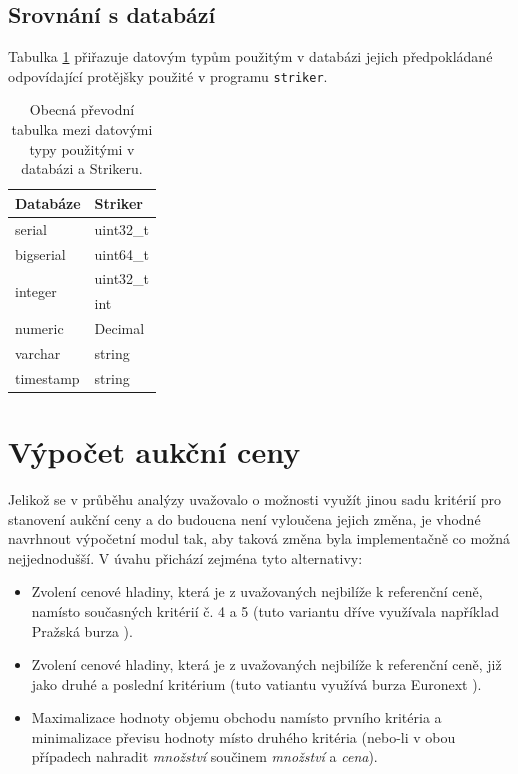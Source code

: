 \documentclass[thesis=M,czech]{FITthesis}[2012/06/26]
\begin{document}

\subsection{Srovnání s databází}

Tabulka \ref{tab:dbstrikertypes} přiřazuje datovým typům použitým v databázi jejich předpokládané odpovídající protějšky 
použité v programu \texttt{striker}.

\begin{table}\centering
	\begin{tabular}{| l | l |}\hline
		Databáze	& Striker	\tabularnewline \hline \hline
		serial	 	& uint32\_t	\tabularnewline \hline
		bigserial	& uint64\_t	\tabularnewline \hline
		\multirow{2}{*}{integer} & uint32\_t	\tabularnewline 
		 		& int		\tabularnewline \hline
   		numeric 	& Decimal	\tabularnewline \hline
		varchar	& string	\tabularnewline \hline
   		timestamp 	& string	\tabularnewline \hline
	\end{tabular}
	\caption[Datové typy v databázi a Strikeru]{Obecná převodní tabulka mezi datovými typy použitými v databázi a Strikeru.}
	\label{tab:dbstrikertypes}
\end{table}


\section{Výpočet aukční ceny}

Jelikož se v průběhu analýzy uvažovalo o možnosti využít jinou sadu kritérií pro stanovení aukční ceny a do budoucna není vyloučena 
jejich změna, je vhodné navrhnout výpočetní modul tak, aby taková změna byla implementačně co možná nejjednodušší. V úvahu 
přichází zejména tyto alternativy:

\begin{itemize}
	\item Zvolení cenové hladiny, která je z uvažovaných nejbilíže k referenční ceně, namísto současných kritérií č. 4 a 5 (tuto
		variantu dříve využívala například Pražská burza \cite{vseanal}).
	\item Zvolení cenové hladiny, která je z uvažovaných nejbilíže k referenční ceně, již jako druhé a poslední kritérium 
		(tuto vatiantu využívá burza Euronext \cite{euronextrules}).
	\item Maximalizace hodnoty objemu obchodu namísto prvního kritéria a minimalizace převisu hodnoty místo druhého kritéria 
		(nebo-li v obou případech nahradit \textit{množství} součinem \textit{množství} a \textit{cena}). 
\end{itemize}
\end{document}
